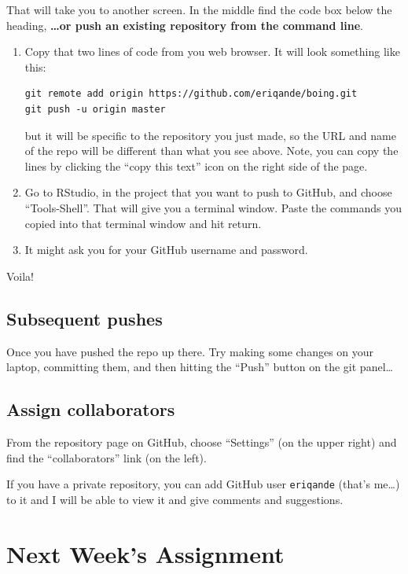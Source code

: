 \documentclass[]{book}
\theoremstyle{definition}
\theoremstyle{definition}
\theoremstyle{remark}
\begin{document}
That will take you to another screen. In the middle find the code box
below the heading, \textbf{\ldots{}or push an existing repository from
the command line}.

\begin{enumerate}
\def\labelenumi{\arabic{enumi}.}
\item
  Copy that two lines of code from you web browser. It will look
  something like this:

\begin{verbatim}
git remote add origin https://github.com/eriqande/boing.git
git push -u origin master
\end{verbatim}

  but it will be specific to the repository you just made, so the URL
  and name of the repo will be different than what you see above. Note,
  you can copy the lines by clicking the ``copy this text'' icon on the
  right side of the page.
\item
  Go to RStudio, in the project that you want to push to GitHub, and
  choose ``Tools-Shell''. That will give you a terminal window. Paste
  the commands you copied into that terminal window and hit return.
\item
  It might ask you for your GitHub username and password.
\end{enumerate}

Voila!

\subsection{Subsequent pushes}\label{subsequent-pushes}

Once you have pushed the repo up there. Try making some changes on your
laptop, committing them, and then hitting the ``Push'' button on the git
panel\ldots{}

\subsection{Assign collaborators}\label{assign-collaborators}

From the repository page on GitHub, choose ``Settings'' (on the upper
right) and find the ``collaborators'' link (on the left).

If you have a private repository, you can add GitHub user
\texttt{eriqande} (that's me\ldots{}) to it and I will be able to view
it and give comments and suggestions.

\section{Next Week's Assignment}\label{next-weeks-assignment}
\end{document}
